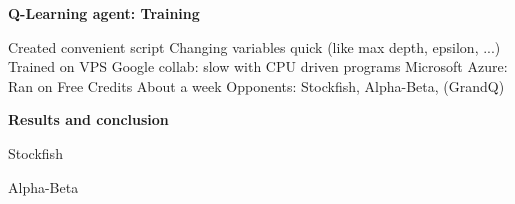 \documentclass[compress]{beamer}
\newcommand{\slidetitle}[1]{\textbf{\Large{#1}}\vspace{5mm}}
\begin{document}
\begin{frame}
    \slidetitle{Q-Learning agent: Training}

    \begin{outline}
        \1 Created convenient script
            \2 Changing variables quick (like max depth, epsilon, ...)
        \1 Trained on VPS
            \2 Google collab: slow with CPU driven programs
            \2 Microsoft Azure:
                \3 Ran on Free Credits
                \3 About a week
                \1 Opponents: Stockfish, Alpha-Beta, (GrandQ)
    \end{outline}

\end{frame}

\begin{frame}
    \slidetitle{Results and conclusion}

    \begin{minipage}{0.4\textwidth}
        \begin{flushleft}
            Stockfish
        \end{flushleft}
    \end{minipage}
    \hfill
    \begin{minipage}{0.4\textwidth}
        \begin{flushright}
            Alpha-Beta
        \end{flushright}
    \end{minipage}


\end{frame}
\end{document}
